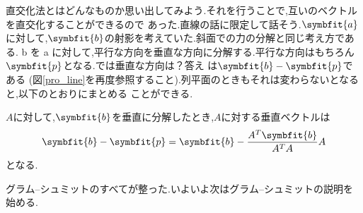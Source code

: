 直交化法とはどんなものか思い出してみよう.それを行うことで,互いのベクトルを直交化することができるので
あった.直線の話に限定して話そう.$\symbfit{a}$に対して,$\symbfit{b}$の射影を考えていた.斜面での力の分解と同じ考え方である.
b を a に対して,平行な方向を垂直な方向に分解する.平行な方向はもちろん$\symbfit{p}$となる.では垂直な方向は？答え
は$\symbfit{b}-\symbfit{p}$である (図\ref{pro_line}を再度参照すること).列平面のときもそれは変わらないとなると,以下のとおりにまとめる
ことができる.
\begin{tcolorbox}[colframe=black!80,colback=white,title=$A$に対して$\symbfit{b}$を垂直に分解する]
$A$に対して,$\symbfit{b}$を垂直に分解したとき,$A$に対する垂直ベクトルは
\[\displaystyle
    \symbfit{b}-\symbfit{p}=\symbfit{b}-\frac{A^T\symbfit{b}}{A^TA}A
\]
となる.
\end{tcolorbox}
グラム--シュミットのすべてが整った.いよいよ次はグラム--シュミットの説明を始める.
